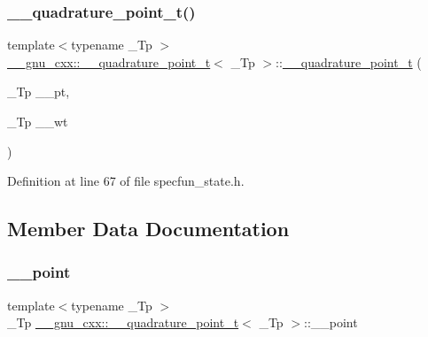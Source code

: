 \subsubsection{\texorpdfstring{\+\_\+\+\_\+quadrature\+\_\+point\+\_\+t()}{\_\_quadrature\_point\_t()}\hspace{0.1cm}{\footnotesize\ttfamily [2/2]}}
{\footnotesize\ttfamily template$<$typename \+\_\+\+Tp $>$ \\
\hyperlink{struct____gnu__cxx_1_1____quadrature__point__t}{\+\_\+\+\_\+gnu\+\_\+cxx\+::\+\_\+\+\_\+quadrature\+\_\+point\+\_\+t}$<$ \+\_\+\+Tp $>$\+::\hyperlink{struct____gnu__cxx_1_1____quadrature__point__t}{\+\_\+\+\_\+quadrature\+\_\+point\+\_\+t} (\begin{DoxyParamCaption}\item[{\+\_\+\+Tp}]{\+\_\+\+\_\+pt,  }\item[{\+\_\+\+Tp}]{\+\_\+\+\_\+wt }\end{DoxyParamCaption})\hspace{0.3cm}{\ttfamily [inline]}}



Definition at line 67 of file specfun\+\_\+state.\+h.



\subsection{Member Data Documentation}
\mbox{\label{struct____gnu__cxx_1_1____quadrature__point__t_a9cbd1d0da59243a75be37c3b54ce7a30}} 
\subsubsection{\texorpdfstring{\+\_\+\+\_\+point}{\_\_point}}
{\footnotesize\ttfamily template$<$typename \+\_\+\+Tp $>$ \\
\+\_\+\+Tp \hyperlink{struct____gnu__cxx_1_1____quadrature__point__t}{\+\_\+\+\_\+gnu\+\_\+cxx\+::\+\_\+\+\_\+quadrature\+\_\+point\+\_\+t}$<$ \+\_\+\+Tp $>$\+::\+\_\+\+\_\+point}



